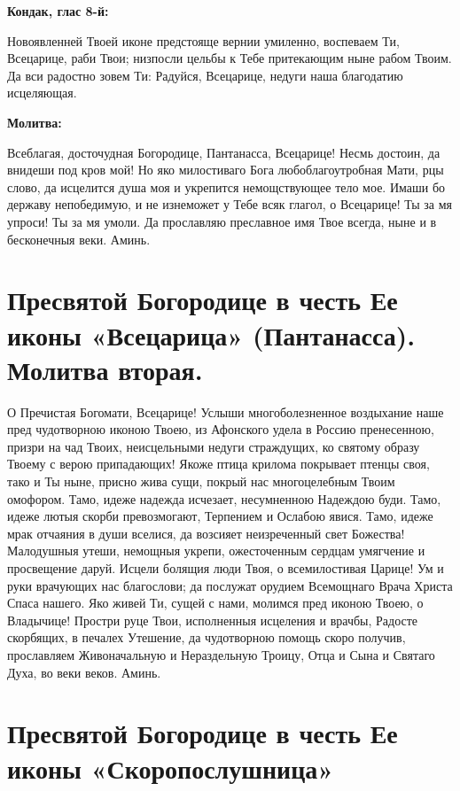 \medskip


\bfseries Кондак, глас 8-й:\normalfont{}\nopagebreak


Новоявленней Твоей иконе предстояще вернии умиленно, воспеваем Ти, Всецарице, раби Твои; низпосли цельбы к Тебе притекающим ныне рабом Твоим. Да вси радостно зовем Ти: Радуйся, Всецарице, недуги наша благодатию исцеляющая.


\medskip


\bfseries Молитва:\normalfont{}\nopagebreak


Всеблагая, досточудная Богородице, Пантанасса, Всецарице! Несмь достоин, да внидеши под кров мой! Но яко милостиваго Бога любоблагоутробная Мати, рцы слово, да исцелится душа моя и укрепится немощствующее тело мое. Имаши бо державу непобедимую, и не изнеможет у Тебе всяк глагол, о Всецарице! Ты за мя упроси! Ты за мя умоли. Да прославляю преславное имя Твое всегда, ныне и в бесконечныя веки. Аминь.


\section{Пресвятой Богородице в честь Ее иконы «Всецарица» (Пантанасса). Молитва вторая.}
 


О Пречистая Богомати, Всецарице! Услыши многоболезненное воздыхание наше пред чудотворною иконою Твоею, из Афонского удела в Россию пренесенною, призри на чад Твоих, неисцельными недуги страждущих, ко святому образу Твоему с верою припадающих! Якоже птица крилома покрывает птенцы своя, тако и Ты ныне, присно жива сущи, покрый нас многоцелебным Твоим омофором. Тамо, идеже надежда исчезает, несумненною Надеждою буди. Тамо, идеже лютыя скорби превозмогают, Терпением и Ослабою явися. Тамо, идеже мрак отчаяния в души вселися, да возсияет неизреченный свет Божества! Малодушныя утеши, немощныя укрепи, ожесточенным сердцам умягчение и просвещение даруй. Исцели болящия люди Твоя, о всемилостивая Царице! Ум и руки врачующих нас благослови; да послужат орудием Всемощнаго Врача Христа Спаса нашего. Яко живей Ти, сущей с нами, молимся пред иконою Твоею, о Владычице! Простри руце Твои, исполненныя исцеления и врачбы, Радосте скорбящих, в печалех Утешение, да чудотворною помощь скоро получив, прославляем Живоначальную и Нераздельную Троицу, Отца и Сына и Святаго Духа, во веки веков. Аминь.


\section{Пресвятой Богородице в честь Ее иконы «Скоропослушница»}
 


